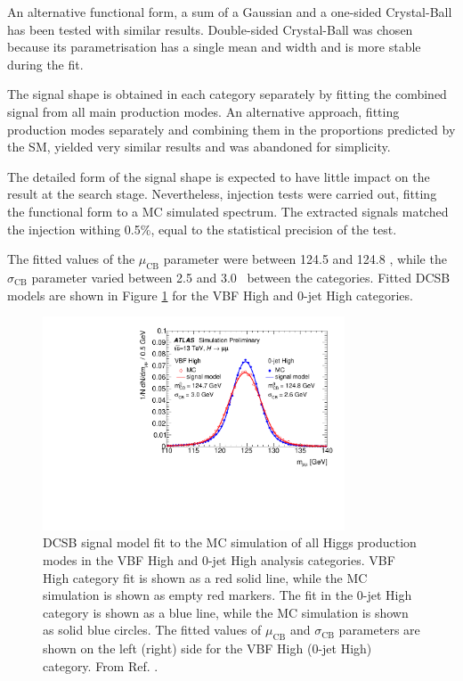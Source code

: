 An alternative functional form, a sum of
a Gaussian and a one-sided Crystal-Ball has been tested with similar
results. Double-sided Crystal-Ball was chosen because its
parametrisation has a single mean and width and is more stable
during the fit.

The signal shape is obtained in each category separately by fitting
the combined signal from all main production modes. An alternative
approach, fitting production modes separately and combining them
in the proportions predicted by the SM, yielded very similar results
and was abandoned for simplicity.

The detailed form of the signal shape is expected to have little
impact on the result at the search stage. Nevertheless, injection
tests were carried out, fitting the functional form to a MC simulated
spectrum. The extracted signals matched the injection withing 0.5\%,
equal to the statistical precision of the test.

The fitted values of the $\mu_\text{CB}$ parameter were between
124.5 and 124.8 \GeV, while the $\sigma_\text{CB}$ parameter varied
between 2.5 and 3.0 \GeV~between the categories. Fitted DCSB models
are shown in Figure \ref{fig:hmumu:sig-model} for the VBF High and
0-jet High categories.
\begin{figure}[h!]
  \centering
  \includegraphics[width=0.8\textwidth]{figures/hmumu/sig-model}
  \caption[$\hmumu$ signal model]{
  DCSB signal model fit to the MC simulation of all Higgs production
  modes in the VBF High and 0-jet High analysis categories. VBF High
  category fit is shown as a red solid line, while the MC simulation
  is shown as empty red markers. The fit in the 0-jet High category
  is shown as a blue line, while the MC simulation is shown as solid 
  blue circles. The fitted values of $\mu_\text{CB}$ and
  $\sigma_\text{CB}$ parameters are shown on the left (right) side 
  for the VBF High (0-jet High) category. From Ref. \cite{ATLAS-CONF-2019-028}.
  }
  \label{fig:hmumu:sig-model}
\end{figure}

